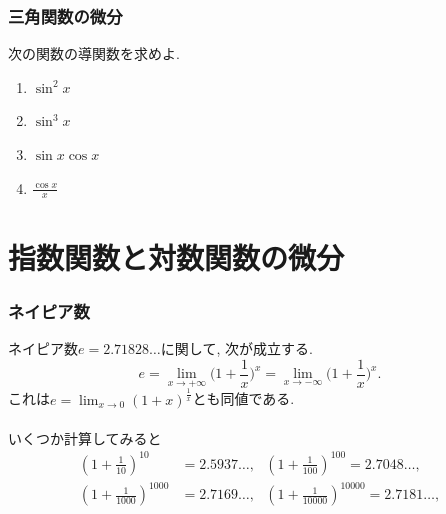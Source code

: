 

\begin{frame}
\frametitle{三角関数の微分}

\begin{Prob}
次の関数の導関数を求めよ. 
\begin{enumerate}
\item $\sin^2 x$
\item $\sin^3 x$
\item $\sin x \cos x$
\item $\frac{\cos x}{x}$
\end{enumerate}
\end{Prob}

\end{frame}



\section{指数関数と対数関数の微分}

\begin{frame}
\frametitle{ネイピア数}

ネイピア数$e=2.71828\dots$に関して, 次が成立する.  
$$
e=\lim_{x \to +\infty} \Big(1+\frac{1}{x}\Big)^x = \lim_{x \to -\infty} \Big(1+\frac{1}{x}\Big)^x. 
$$
これは$\displaystyle e=\lim_{x\to 0}(1+x)^\frac{1}{x}$とも同値である. \\
\ \\

いくつか計算してみると
\begin{align*}
(1+\frac{1}{10})^{10}&=2.5937\dots, \ \ \ 
(1+\frac{1}{100})^{100}=2.7048\dots, \\
(1+\frac{1}{1000})^{1000}&=2.7169\dots, \ \ \ 
(1+\frac{1}{10000})^{10000}=2.7181\dots, 
\end{align*}

\end{frame}







